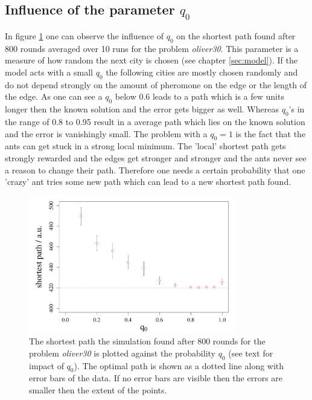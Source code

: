 
\subsection{Influence of the parameter $q_0$}

In figure \ref{fig:q0zushortestpath} one can observe the influence of $q_0$ on the shortest path found after 800 rounds averaged over 10 runs for the problem \textit{oliver30}. This parameter is a measure of how random the next city is chosen (see chapter \ref{sec:model}). If the model acts with a small $q_0$ the following cities are mostly chosen randomly and do not depend strongly on the amount of pheromone on the edge or the length of the edge. As one can see a $q_0$ below 0.6 leads to a path which is a few units longer then the known solution and the error gets bigger as well. Whereas $q_0$'s in the range of 0.8 to 0.95 result in a average path which lies on the known solution and the error is vanishingly small. The problem with a $q_0 = 1$ is the fact that the ants can get stuck in a strong local minimum. The 'local' shortest path gets strongly rewarded and the edges get stronger and stronger and the ants never see a reason to change their path. Therefore one needs a certain probability that one 'crazy' ant tries some new path which can lead to a new shortest path found.

\begin{figure}[H]

	\centering
	\includegraphics[width=0.8\textwidth]{Plots/q0_vs_shortestpath.pdf}

\caption{The shortest path the simulation found after 800 rounds for the problem \textit{oliver30} is plotted against the probability $q_0$ (see text for impact of $q_0$). The optimal path is shown as a dotted line along with error bars of the data. If no error bars are visible then the errors are smaller then the extent of the points.}
\label{fig:q0zushortestpath}
\end{figure}
